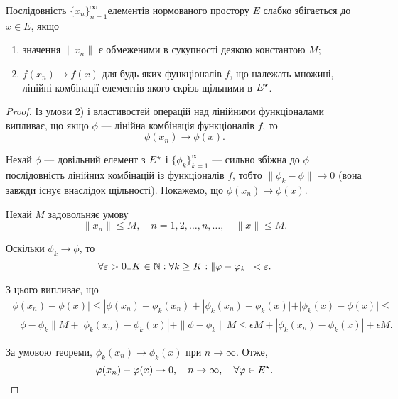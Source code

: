 \begin{theorem}
Послідовність $\{x_n\}_{n = 1}^\infty$елементів
нормованого простору $E$ слабко збігається до $x \in E$, якщо
\begin{enumerate}
\item значення $\|x_n\|$ є обмеженими в сукупності деякою
константою $M$;
\item $f(x_n) \to f(x)$ для будь-яких функціоналів $f$, що
належать множині, лінійні комбінації елементів якого скрізь
щільними в $E^\star$.
\end{enumerate}
\end{theorem}

\begin{proof}
Із умови 2) і властивостей операцій над
лінійними функціоналами випливає, що якщо $\phi$ --- лінійна
комбінація функціоналів $f$, то
\begin{equation*}
    \phi(x_n) \to \phi(x).
\end{equation*}

Нехай $\phi$ --- довільний елемент з $E^\star$ і $\{\phi_k\}_{k = 1}^\infty$
--- сильно збіжна до $\phi$ послідовність лінійних комбінацій із
функціоналів $f$, тобто $\|\phi_k - \phi\| \to 0$ (вона завжди існує
внаслідок щільності). Покажемо, що $\phi(x_n) \to \phi(x)$.

Нехай $M$ задовольняє умову
\begin{equation*}
    \|x_n\| \le M, \quad n = 1, 2, \dots, n, \dots, \quad \|x\| \le M.
\end{equation*}

Оскільки $\phi_k \to \phi$, то
\begin{equation*}
    \forall \varepsilon > 0 \exists K \in \mathbb{N}:
    \forall k \ge K: \|\varphi - \varphi_k\| < \varepsilon.
\end{equation*}

З цього випливає, що
\begin{multline*}
    |\phi(x_n) - \phi(x)| \le
    |\phi(x_n) - \phi_k(x_n) +
    |\phi_k(x_n) - \phi_k(x)| +
    |\phi_k(x) - \phi(x)| \le \\
    \|\phi - \phi_k\| M +
    |\phi_k(x_n) - \phi_k(x)| +
    \|\phi - \phi_k\| M \le 
    \epsilon M + 
    |\phi_k(x_n) - \phi_k(x)| +
    \epsilon M.
\end{multline*}

За умовою теореми, $\phi_k(x_n) \to \phi_k(x)$ при $n \to \infty$. Отже,
\begin{equation*}
    \varphi(x_n) - \varphi(x) \to 0, \quad n \to \infty, \quad \forall \varphi \in E^\star. \qedhere
\end{equation*}
\end{proof}

